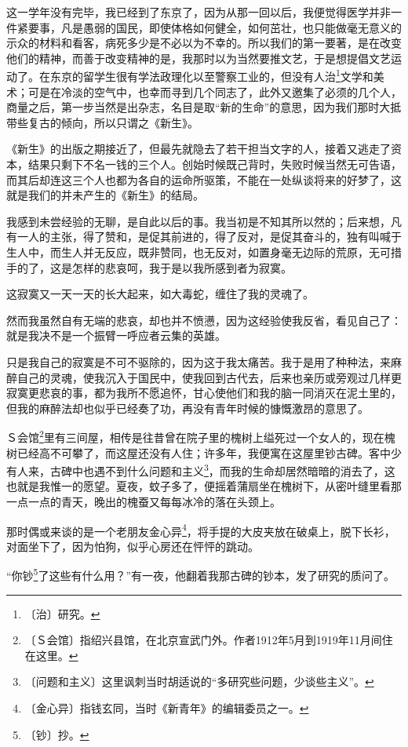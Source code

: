 \documentclass[12pt,UTF-8,openany]{ctexbook}
\begin{document}
\begin{normalsize}
    这一学年没有完毕，我已经到了东京了，因为从那一回以后，我便觉得医学并非一件紧要事，凡是愚弱的国民，即使体格如何健全，如何茁壮，也只能做毫无意义的示众的材料和看客，病死多少是不必以为不幸的。所以我们的第一要著，是在改变他们的精神，而善于改变精神的是，我那时以为当然要推文艺，于是想提倡文艺运动了。在东京的留学生很有学法政理化以至警察工业的，但没有人治\footnote{〔治〕研究。}文学和美术；可是在冷淡的空气中，也幸而寻到几个同志了，此外又邀集了必须的几个人，商量之后，第一步当然是出杂志，名目是取“新的生命”的意思，因为我们那时大抵带些复古的倾向，所以只谓之《新生》。
    
    《新生》的出版之期接近了，但最先就隐去了若干担当文字的人，接着又逃走了资本，结果只剩下不名一钱的三个人。创始时候既己背时，失败时候当然无可告语，而其后却连这三个人也都为各自的运命所驱策，不能在一处纵谈将来的好梦了，这就是我们的并未产生的《新生》的结局。
    
    我感到未尝经验的无聊，是自此以后的事。我当初是不知其所以然的；后来想，凡有一人的主张，得了赞和，是促其前进的，得了反对，是促其奋斗的，独有叫喊于生人中，而生人并无反应，既非赞同，也无反对，如置身毫无边际的荒原，无可措手的了，这是怎样的悲哀呵，我于是以我所感到者为寂寞。
    
    这寂寞又一天一天的长大起来，如大毒蛇，缠住了我的灵魂了。
    
    然而我虽然自有无端的悲哀，却也并不愤懑，因为这经验使我反省，看见自己了：就是我决不是一个振臂一呼应者云集的英雄。
    
    只是我自己的寂寞是不可不驱除的，因为这于我太痛苦。我于是用了种种法，来麻醉自己的灵魂，使我沉入于国民中，使我回到古代去，后来也亲历或旁观过几样更寂寞更悲哀的事，都为我所不愿追怀，甘心使他们和我的脑一同消灭在泥土里的，但我的麻醉法却也似乎已经奏了功，再没有青年时候的慷慨激昂的意思了。
    
    Ｓ会馆\footnote{〔Ｓ会馆〕指绍兴县馆，在北京宣武门外。作者1912年5月到1919年11月间住在这里。}里有三间屋，相传是往昔曾在院子里的槐树上缢死过一个女人的，现在槐树已经高不可攀了，而这屋还没有人住；许多年，我便寓在这屋里钞古碑。客中少有人来，古碑中也遇不到什么问题和主义\footnote{〔问题和主义〕这里讽刺当时胡适说的“多研究些问题，少谈些主义”。}，而我的生命却居然暗暗的消去了，这也就是我惟一的愿望。夏夜，蚊子多了，便摇着蒲扇坐在槐树下，从密叶缝里看那一点一点的青天，晚出的槐蚕又每每冰冷的落在头颈上。
    
    那时偶或来谈的是一个老朋友金心异\footnote{〔金心异〕指钱玄同，当时《新青年》的编辑委员之一。}，将手提的大皮夹放在破桌上，脱下长衫，对面坐下了，因为怕狗，似乎心房还在怦怦的跳动。
    
    “你钞\footnote{〔钞〕抄。}了这些有什么用？”有一夜，他翻着我那古碑的钞本，发了研究的质问了。
    

\end{normalsize}
\end{document}
